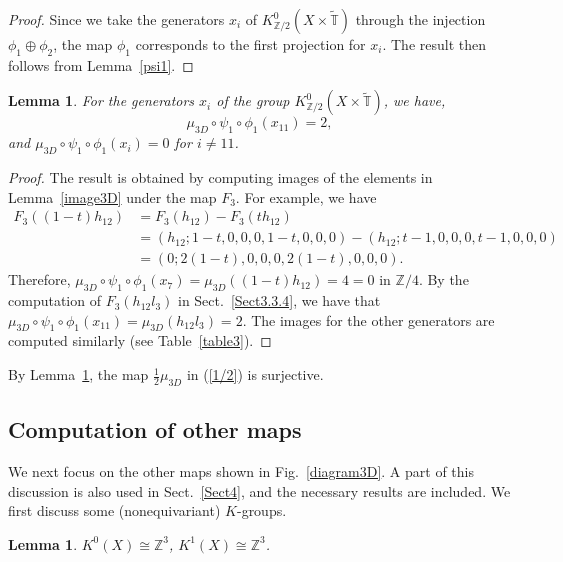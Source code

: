 \documentclass{amsart}
\theoremstyle{plain}
\newtheorem{lemma}[theorem]{Lemma}
\theoremstyle{definition}
\theoremstyle{remark}
\newcommand{\Z}{\mathbb{Z}}
\newcommand{\T}{\mathbb{T}}
\newcommand{\tT}{\widetilde{\T}}
\begin{document}
\begin{proof}
Since we take the generators $x_i$ of $K^0_{\Z/2}(X \times \tT)$ through the injection $\phi_1 \oplus \phi_2$, the map $\phi_1$ corresponds to the first projection for $x_i$.
The result then follows from Lemma~\ref{psi1}.
\end{proof}

\begin{lemma}
\label{02}
For the generators $x_i$ of the group $K^0_{\Z/2}(X \times \tT)$, we have,
\begin{equation*}
	\mu_{3D} \circ \psi_1 \circ \phi_1 (x_{11}) = 2,
\end{equation*}
and $\mu_{3D} \circ \psi_1 \circ \phi_1 (x_i) = 0$ for $i \neq 11$.
\end{lemma}

\begin{proof}
The result is obtained by computing images of the elements in Lemma~\ref{image3D} under the map $F_3$.
For example, we have
\begin{align*}
	F_3((1-t)h_{12}) &= F_3(h_{12})  - F_3(th_{12})\\
		&= (h_{12} ; 1-t, 0,0,0, 1-t, 0,0,0) - (h_{12}; t-1, 0,0,0, t-1, 0,0,0)\\
		&= (0; 2(1-t), 0,0,0, 2(1-t), 0,0,0).
\end{align*}
Therefore, $\mu_{3D} \circ \psi_1 \circ \phi_1 (x_7) = \mu_{3D}((1-t)h_{12}) = 4 = 0$ in $\Z/4$.
By the computation of $F_3(h_{12} l_3)$ in Sect.~\ref{Sect3.3.4}, we have that $\mu_{3D} \circ \psi_1 \circ \phi_1 (x_{11}) = \mu_{3D}(h_{12} l_3) = 2$.
The images for the other generators are computed similarly (see Table~\ref{table3}).
\end{proof}

By Lemma~\ref{02}, the map $\frac{1}{2}\mu_{3D}$ in (\ref{1/2}) is surjective.

\subsection{Computation of other maps}
\label{Sect3.4}
We next focus on the other maps shown in Fig.~\ref{diagram3D}.
A part of this discussion is also used in Sect.~\ref{Sect4}, and the necessary results are included.
We first discuss some (nonequivariant) $K$-groups.

\begin{lemma}
\label{KX}
	$K^0(X) \cong \Z^3$, $K^1(X) \cong \Z^3$.
\end{lemma}
\end{document}
